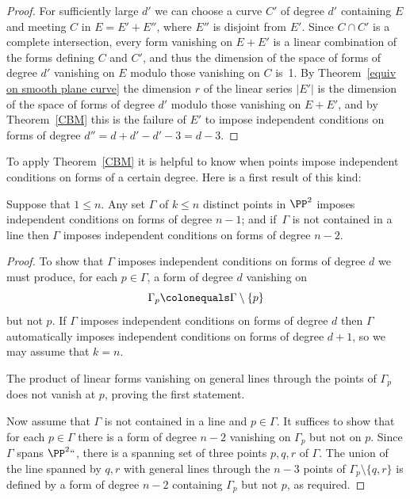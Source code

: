 \begin{proof}
For sufficiently large $d'$ we can choose a curve $C'$ of degree $d'$ containing
$E$ and meeting $C$ in $E = E'+E''$, where $E''$ is disjoint from $E'$. Since $C\cap C'$
is a complete intersection, every form vanishing on $E+E'$ is a linear combination of
the forms defining $C$ and $C'$, and thus the dimension of the space of forms of degree $d'$
vanishing on $E$ modulo those vanishing on $C$ is~1. By
Theorem~\ref{equiv on smooth plane curve} the dimension $r$ of the
linear series $|E'|$ is the dimension of the space of
forms of degree $d'$ modulo those vanishing on $E+E'$, and by Theorem~\ref{CBM} this
is the failure of $E'$ to impose independent conditions on forms of degree
$d'' = d+d' - d' -3 = d-3$.
\unif
\end{proof}

To apply Theorem~\ref{CBM} it is helpful to know when points impose independent conditions on forms of a certain degree. Here is a first result of this kind:
%

\begin{proposition}\label{n-2 independence}
Suppose that $1\leq n$. Any set $\Gamma$ of $k\leq n$ distinct points
in $\PP^{2}$ imposes independent conditions on forms of degree $n-1$;
and if $\,\Gamma$ is not contained in a line then $\Gamma$ imposes
independent conditions on forms of degree $n-2$.
\unif
\end{proposition}

\begin{proof} To show that $\Gamma$ imposes independent conditions on forms of degree $d$ we must produce, for each $p\in \Gamma$, a form of degree $d$ vanishing on 
$$
\Gamma_{p}\colonequals\Gamma\setminus\{p\}
$$
 but not $p$. If $\Gamma$ imposes independent conditions on forms of degree $d$ then
 $\Gamma$ automatically imposes independent conditions on forms of degree $d+1$,
 so we may assume that $k=n$.
 
The product of linear forms
 vanishing on general lines through the points of $\Gamma_{p}$ does not vanish at $p$, proving the first statement.

Now assume that $\Gamma$ is not contained in a line and $p\in \Gamma$.
It suffices to show that for each $p\in \Gamma$ there is a form of
degree $n-2$ vanishing on $\Gamma_{p}$ but not on $p$. Since $\Gamma$
spans $\PP^2` `$, there is a spanning set of three points $p,q,r$ of
$\Gamma$. The union of the line spanned by $q,r$ with general lines
through the $n-3$ points of $\Gamma_{p}\setminus\{q,r\}$ is defined by a form of degree $n-2$ containing $\Gamma_{p}$ but not $p$, 
as required. 
\end{proof}

